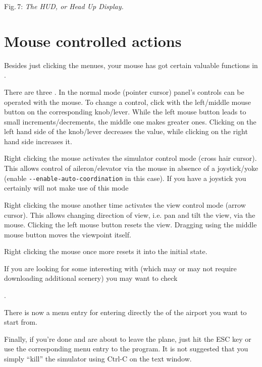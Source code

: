 \smallskip
 \noindent
Fig.\,7: \textit{The HUD, or Head Up Display.}
\medskip

\section{Mouse controlled actions}

Besides just clicking the menues, your mouse has got certain valuable functions
in \FlightGear{}.


There are three . In the normal mode
(pointer cursor) panel's controls can be operated with the mouse. To
change a control, click with the left/middle mouse button on the
corresponding knob/lever. While the left mouse button leads to small
increments/decrements, the middle one makes greater ones. Clicking on
the left hand side of the knob/lever decreases the value, while
clicking on the right hand side increases it.

 Right clicking the mouse activates the simulator control mode (cross
 hair cursor). This allows control of aileron/elevator via the mouse in
 absence of a joystick/yoke (enable \texttt{-$
 $-enable-auto-coordination} in this case). If you have a joystick you
 certainly will not make use of this mode

 Right clicking the mouse another time activates the view control mode (arrow
cursor).
 This allows changing direction of view, i.e. pan and tilt the view, via the
mouse. 
 Clicking the left mouse button resets the view. 
 Dragging using the middle mouse button moves the viewpoint itself.

 Right clicking the mouse once more resets it into the initial state.

If you are looking for some interesting  with
\FlightGear{}
(which may or may not require downloading additional scenery) you may want to
check
 \medskip

 .
  \medskip

\noindent
 There is now a menu entry for entering directly the  of the
airport you want to start from.

Finally, if you're done and are about to leave the plane, just hit the ESC key
or use the
corresponding menu entry to  the program. It is not suggested that
you simply
``kill'' the simulator using Ctrl-C on the text window.



